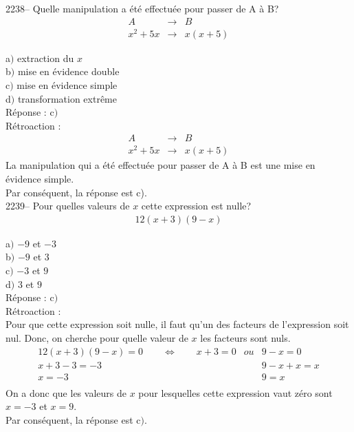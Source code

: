 \documentclass[letterpaper, 12pt]{article}
\begin{document}
2238-- Quelle manipulation a \'et\'e effectu\'ee pour passer de A \`a B?
\begin{eqnarray*}
 A &\rightarrow& B\\
x^{2}+5x &\rightarrow& x(x+5)
\end{eqnarray*}

a$)$ extraction du $x$\\
b$)$ mise en \'evidence double\\
c$)$ mise en \'evidence simple \\
d$)$ transformation extr\^eme\\

R\'eponse : c$)$\\

R\'etroaction :
\begin{eqnarray*}
 A &\rightarrow& B\\
x^{2}+5x &\rightarrow& x(x+5)
\end{eqnarray*}
La manipulation qui a \'et\'e effectu\'ee pour passer de A \`a B est une mise en \'evidence simple.\\
Par cons\'equent, la r\'eponse est c).\\

2239-- Pour quelles valeurs de $x$ cette expression est nulle?
\begin{eqnarray*}
12(x+3)(9-x)
\end{eqnarray*}

a$)$ $-9$ et $-3$\\
b$)$ $-9$ et $3$\\
c$)$ $-3$ et $9$\\
d$)$ $3$ et $9$\\

R\'eponse : c$)$\\

R\'etroaction :\\
Pour que cette expression soit nulle, il faut qu'un des facteurs de l'expression soit nul. Donc, on cherche pour quelle valeur de $x$ les facteurs sont nuls.
\begin{eqnarray*}
12(x+3)(9-x) =0 \qquad \Longleftrightarrow \qquad x+3 = 0 &ou& 9-x=0\\
x+3-3 = -3 & & 9-x+x=x\\
x = -3 & & 9=x\\
\end{eqnarray*}
On a donc que les valeurs de $x$ pour lesquelles cette expression vaut z\'ero sont $x = -3$ et $x=9$.\\
Par cons\'equent, la r\'eponse est c$)$.\\
\end{document}
